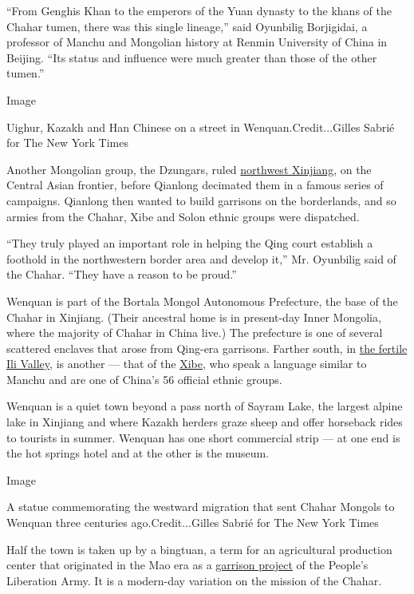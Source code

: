 ``From Genghis Khan to the emperors of the Yuan dynasty to the khans of
the Chahar tumen, there was this single lineage,'' said Oyunbilig
Borjigidai, a professor of Manchu and Mongolian history at Renmin
University of China in Beijing. ``Its status and influence were much
greater than those of the other tumen.''

Image

Uighur, Kazakh and Han Chinese on a street in Wenquan.Credit...Gilles
Sabrié for The New York Times

Another Mongolian group, the Dzungars, ruled
\href{https://www.nytimes3xbfgragh.onion/2014/05/31/world/asia/chinas-leader-lays-out-plan-to-pacify-restive-region.html?mcubz=2}{northwest
Xinjiang}, on the Central Asian frontier, before Qianlong decimated them
in a famous series of campaigns. Qianlong then wanted to build garrisons
on the borderlands, and so armies from the Chahar, Xibe and Solon ethnic
groups were dispatched.

``They truly played an important role in helping the Qing court
establish a foothold in the northwestern border area and develop it,''
Mr. Oyunbilig said of the Chahar. ``They have a reason to be proud.''

Wenquan is part of the Bortala Mongol Autonomous Prefecture, the base of
the Chahar in Xinjiang. (Their ancestral home is in present-day Inner
Mongolia, where the majority of Chahar in China live.) The prefecture is
one of several scattered enclaves that arose from Qing-era garrisons.
Farther south, in
\href{https://www.farwestchina.com/2016/07/yili-xinjiang-top-5-places-visit.html}{the
fertile Ili Valley}, is another --- that of the
\href{https://www.nytimes3xbfgragh.onion/2016/01/12/world/asia/china-xinjiang-manchu-xibe-language.html?mcubz=2}{Xibe},
who speak a language similar to Manchu and are one of China's 56
official ethnic groups.

Wenquan is a quiet town beyond a pass north of Sayram Lake, the largest
alpine lake in Xinjiang and where Kazakh herders graze sheep and offer
horseback rides to tourists in summer. Wenquan has one short commercial
strip --- at one end is the hot springs hotel and at the other is the
museum.

Image

A statue commemorating the westward migration that sent Chahar Mongols
to Wenquan three centuries ago.Credit...Gilles Sabrié for The New York
Times

Half the town is taken up by a bingtuan, a term for an agricultural
production center that originated in the Mao era as a
\href{http://www.nytimes3xbfgragh.onion/2009/08/07/world/asia/07xinjiang.html?mcubz=2}{garrison
project} of the People's Liberation Army. It is a modern-day variation
on the mission of the Chahar.

